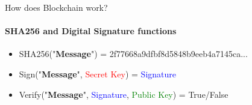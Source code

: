 \begin{frame}{How does Blockchain work?}
    \framesubtitle{SHA256 and Digital Signature functions}
    \begin{itemize}
        \item SHA256("\textbf{Message}") = 2f77668a9dfbf8d5848b9eeb4a7145ca...
        \item Sign("\textbf{Message}", \textcolor{red}{Secret Key}) = \textcolor{blue}{Signature}\\
        \item Verify("\textbf{Message}", {\normalfont\textcolor{blue}{Signature}, \textcolor{green}{Public Key}) = True/False}\\
        \centering
    \end{itemize}
\end{frame}